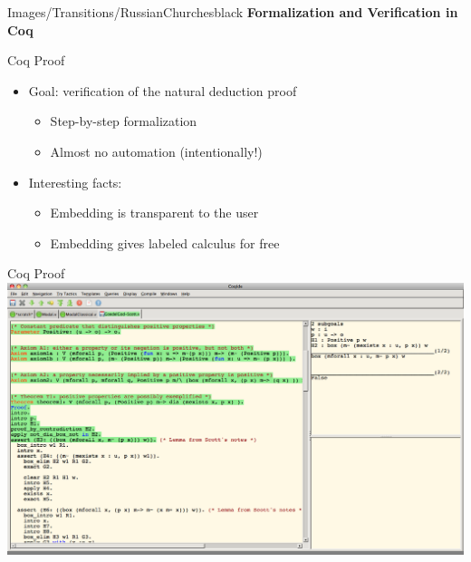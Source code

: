 \begin{transitionframe}{Images/Transitions/RussianChurches}{black}
\textbf{Formalization and Verification in Coq}
\end{transitionframe}

\begin{frame}{Coq Proof}
\begin{itemize}
\item \begin{LARGE} Goal: verification of the natural deduction proof \end{LARGE}
\begin{itemize}
\item \begin{large} Step-by-step formalization \end{large}
\pause
\item \begin{large} Almost no automation (intentionally!) \end{large}
\end{itemize}
%
\pause
\item \begin{LARGE} Interesting facts: \end{LARGE}
\begin{itemize}
\item \begin{large} Embedding is transparent to the user \end{large}
\pause
\item \begin{large} Embedding gives labeled calculus for free \end{large}
\end{itemize}
\end{itemize}
\end{frame}

\begin{frame}{Coq Proof}
\colorbox{gray}{\includegraphics[width=\textwidth]{Images/Demos/CoqDemo.png}}
\end{frame}
